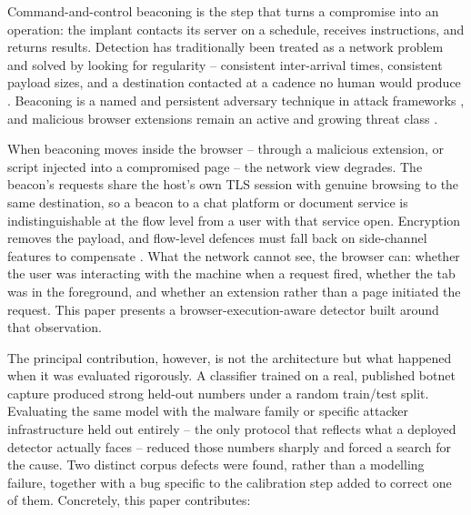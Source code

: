\documentclass[conference,a4paper]{IEEEtran}
\begin{document}
Command-and-control beaconing is the step that turns a compromise into an operation: the implant contacts its server on a schedule, receives instructions, and returns results. Detection has traditionally been treated as a network problem and solved by looking for regularity -- consistent inter-arrival times, consistent payload sizes, and a destination contacted at a cadence no human would produce \cite{garcia2014ctu13, gu2008botminer, bilge2012disclosure}. Beaconing is a named and persistent adversary technique in attack frameworks \cite{mitre2018attack}, and malicious browser extensions remain an active and growing threat class \cite{singh2025malicious}.

When beaconing moves inside the browser -- through a malicious extension, or script injected into a compromised page -- the network view degrades. The beacon's requests share the host's own TLS session with genuine browsing to the same destination, so a beacon to a chat platform or document service is indistinguishable at the flow level from a user with that service open. Encryption removes the payload, and flow-level defences must fall back on side-channel features to compensate \cite{anderson2016identifying}. What the network cannot see, the browser can: whether the user was interacting with the machine when a request fired, whether the tab was in the foreground, and whether an extension rather than a page initiated the request. This paper presents a browser-execution-aware detector built around that observation.

The principal contribution, however, is not the architecture but what happened when it was evaluated rigorously. A classifier trained on a real, published botnet capture produced strong held-out numbers under a random train/test split. Evaluating the same model with the malware family or specific attacker infrastructure held out entirely -- the only protocol that reflects what a deployed detector actually faces -- reduced those numbers sharply and forced a search for the cause. Two distinct corpus defects were found, rather than a modelling failure, together with a bug specific to the calibration step added to correct one of them. Concretely, this paper contributes:
\end{document}
